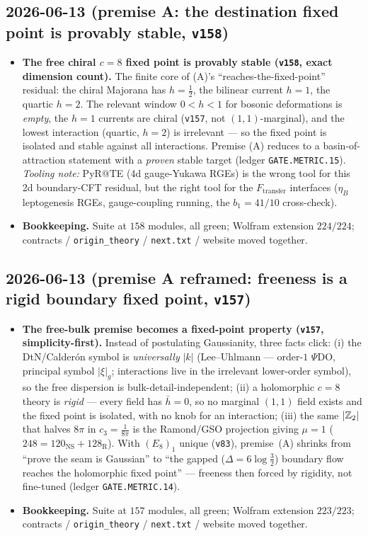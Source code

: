 \documentclass[11pt]{article}
\providecommand{\vref}[1]{\texttt{#1}}
\providecommand{\cthree}{c_3}\providecommand{\phiz}{\varphi_0^{\mathrm{ret}}}
\begin{document}
\subsection*{2026-06-13 (premise A: the destination fixed point is provably stable, \vref{v158})}
\begin{itemize}
\item \textbf{The free chiral $c{=}8$ fixed point is provably stable (\vref{v158}, exact dimension count).}
  The finite core of (A)'s ``reaches-the-fixed-point'' residual: the chiral Majorana has $h{=}\tfrac12$,
  the bilinear current $h{=}1$, the quartic $h{=}2$. The relevant window $0<h<1$ for bosonic deformations
  is \emph{empty}, the $h{=}1$ currents are chiral (\vref{v157}, not $(1,1)$-marginal), and the lowest
  interaction (quartic, $h{=}2$) is irrelevant --- so the fixed point is isolated and stable against all
  interactions. Premise (A) reduces to a basin-of-attraction statement with a \emph{proven} stable target
  (ledger \texttt{GATE.METRIC.15}). \emph{Tooling note:} PyR@TE (4d gauge-Yukawa RGEs) is the wrong tool
  for this 2d boundary-CFT residual, but the right tool for the $F_{\mathrm{transfer}}$ interfaces
  ($\eta_B$ leptogenesis RGEs, gauge-coupling running, the $b_1{=}41/10$ cross-check).
\item \textbf{Bookkeeping.} Suite at $158$ modules, all green; Wolfram extension $224/224$;
  contracts / \texttt{origin\_theory} / \texttt{next.txt} / website moved together.
\end{itemize}

\subsection*{2026-06-13 (premise A reframed: freeness is a rigid boundary fixed point, \vref{v157})}
\begin{itemize}
\item \textbf{The free-bulk premise becomes a fixed-point property (\vref{v157}, simplicity-first).}
  Instead of postulating Gaussianity, three facts click: (i) the DtN/Calder\'on symbol is
  \emph{universally} $|k|$ (Lee--Uhlmann --- order-$1$ $\Psi$DO, principal symbol $|\xi|_g$;
  interactions live in the irrelevant lower-order symbol), so the free dispersion is
  bulk-detail-independent; (ii) a holomorphic $c{=}8$ theory is \emph{rigid} --- every field has
  $\bar h{=}0$, so no marginal $(1,1)$ field exists and the fixed point is isolated, with no knob for an
  interaction; (iii) the same $|\mathbb{Z}_2|$ that halves $8\pi$ in $\cthree=\tfrac1{8\pi}$ is the Ramond/GSO
  projection giving $\mu{=}1$ ($248{=}120_{\mathrm{NS}}{+}128_{\mathrm R}$). With $(E_8)_1$ unique
  (\vref{v83}), premise~(A) shrinks from ``prove the seam is Gaussian'' to ``the gapped
  ($\Delta{=}6\log\tfrac32$) boundary flow reaches the holomorphic fixed point'' --- freeness then forced
  by rigidity, not fine-tuned (ledger \texttt{GATE.METRIC.14}).
\item \textbf{Bookkeeping.} Suite at $157$ modules, all green; Wolfram extension $223/223$;
  contracts / \texttt{origin\_theory} / \texttt{next.txt} / website moved together.
\end{itemize}
\end{document}
